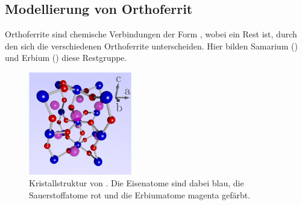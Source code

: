\documentclass[main.tex]{subfiles}
\begin{document}
\subsection{Modellierung von Orthoferrit}

Orthoferrite sind chemische Verbindungen der Form , wobei  ein
Rest ist, durch den sich die verschiedenen Orthoferrite unterscheiden. Hier
bilden Samarium () und Erbium () diese Restgruppe.

\begin{figure}[H]
	\centering

	\includegraphics[width=0.4\textwidth]{bilder/jschlege/UnitCell_labeled.png}
	\caption{Kristallstruktur von
		. Die Eisenatome sind dabei blau, die
		Sauerstoffatome rot und die Erbiumatome magenta gefärbt.
		\cite{schlegel-master}}
	\label{fig:orthoferrit}
\end{figure}
\end{document}
